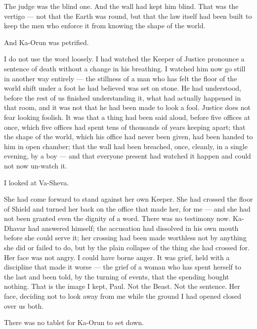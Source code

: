 The judge was the blind one. And the wall had kept him blind. That was the vertigo — not that the Earth was round, but that the law itself had been built to keep the men who enforce it from knowing the shape of the world.\par
 
\ornament
 
And Ka-Orun was petrified.\par
 
I do not use the word loosely. I had watched the Keeper of Justice pronounce a sentence of death without a change in his breathing. I watched him now go still in another way entirely — the stillness of a man who has felt the floor of the world shift under a foot he had believed was set on stone. He had understood, before the rest of us finished understanding it, what had actually happened in that room, and it was not that he had been made to look a fool. Justice does not fear looking foolish. It was that a thing had been said aloud, before five offices at once, which five offices had spent tens of thousands of years keeping apart; that the shape of the world, which his office had never been given, had been handed to him in open chamber; that the wall had been breached, once, cleanly, in a single evening, by a boy — and that everyone present had watched it happen and could not now un-watch it.\par
 
I looked at Va-Sheva.\par
 
She had come forward to stand against her own Keeper. She had crossed the floor of Shield and turned her back on the office that made her, for me — and she had not been granted even the dignity of a word. There was no testimony now. Ka-Dhavar had answered himself; the accusation had dissolved in his own mouth before she could serve it; her crossing had been made worthless not by anything she did or failed to do, but by the plain collapse of the thing she had crossed for. Her face was not angry. I could have borne anger. It was grief, held with a discipline that made it worse — the grief of a woman who has spent herself to the last and been told, by the turning of events, that the spending bought nothing. That is the image I kept, Paul. Not the Beast. Not the sentence. Her face, deciding not to look away from me while the ground I had opened closed over us both.\par
 
\ornament
 
There was no tablet for Ka-Orun to set down.\par
 
